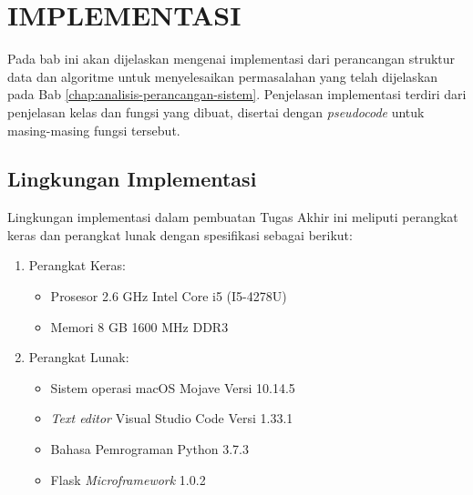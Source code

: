 \chapter{IMPLEMENTASI} \label{chap:implementasi}

\tab Pada bab ini akan dijelaskan mengenai implementasi dari perancangan struktur data dan algoritme untuk menyelesaikan permasalahan \problemDua{} yang telah dijelaskan pada Bab \ref{chap:analisis-perancangan-sistem}. Penjelasan implementasi terdiri dari penjelasan kelas dan fungsi yang dibuat, disertai dengan \textit{pseudocode} untuk masing-masing fungsi tersebut.

\section{Lingkungan Implementasi}
\tab Lingkungan implementasi dalam pembuatan Tugas Akhir ini meliputi perangkat keras dan perangkat lunak dengan spesifikasi sebagai berikut:

\begin{enumerate}
	\item Perangkat Keras:
		\begin{itemize}
			\item Prosesor 2.6 GHz Intel Core i5 (I5-4278U)
			\item Memori 8 GB 1600 MHz DDR3
		\end{itemize}
	\item Perangkat Lunak:
	\begin{itemize}
		\item Sistem operasi macOS Mojave Versi 10.14.5
		\item \textit{Text editor} Visual Studio Code Versi 1.33.1
		\item Bahasa Pemrograman Python 3.7.3
		\item Flask \textit{Microframework} 1.0.2
	\end{itemize}			
\end{enumerate}

